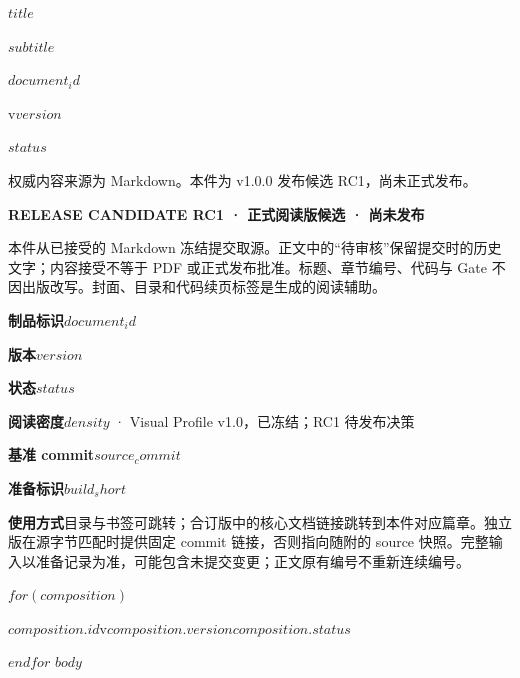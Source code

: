 \documentclass[UTF8,fontset=none,scheme=plain,11pt,a4paper,oneside,openany]{kbbook}
\begin{document}
\pagestyle{empty}
\pagecolor{PreviewNavy}\color{white}
\vspace*{30mm}
\begin{flushleft}{\sffamily\bfseries\fontsize{29}{38}\selectfont $title$\par}\end{flushleft}
\vspace{8mm}
{\sffamily\large $subtitle$\par}
\vfill
{\sffamily\small $document_id$\par\medskip v$version$\par\medskip $status$\par}
\vspace{10mm}
{\small 权威内容来源为 Markdown。本件为 v1.0.0 发布候选 RC1，尚未正式发布。\par}
\clearpage\nopagecolor\color{PreviewInk}\pagestyle{fancy}
\noindent\textbf{RELEASE CANDIDATE RC1 · 正式阅读版候选 · 尚未发布}

本件从已接受的 Markdown 冻结提交取源。正文中的“待审核”保留提交时的历史文字；内容接受不等于 PDF 或正式发布批准。标题、章节编号、代码与 Gate 不因出版改写。封面、目录和代码续页标签是生成的阅读辅助。

\medskip
\noindent\textbf{制品标识}\quad $document_id$\par
\noindent\textbf{版本}\quad $version$\par
\noindent\textbf{状态}\quad $status$\par
\noindent\textbf{阅读密度}\quad $density$ · Visual Profile v1.0，已冻结；RC1 待发布决策\par
\noindent\textbf{基准 commit}\quad\texttt{$source_commit$}\par
\noindent\textbf{准备标识}\quad\texttt{$build_short$}\par
\noindent\textbf{使用方式}\quad 目录与书签可跳转；合订版中的核心文档链接跳转到本件对应篇章。独立版在源字节匹配时提供固定 commit 链接，否则指向随附的 source 快照。完整输入以准备记录为准，可能包含未提交变更；正文原有编号不重新连续编号。

$for(composition)$
\par\noindent\hyperlink{$composition.anchor$}{\textbf{$composition.id$}}\quad v$composition.version$\quad $composition.status$\par
$endfor$
\clearpage
\setcounter{tocdepth}{$toc_depth$}
\tableofcontents
\clearpage
$body$
\end{document}
